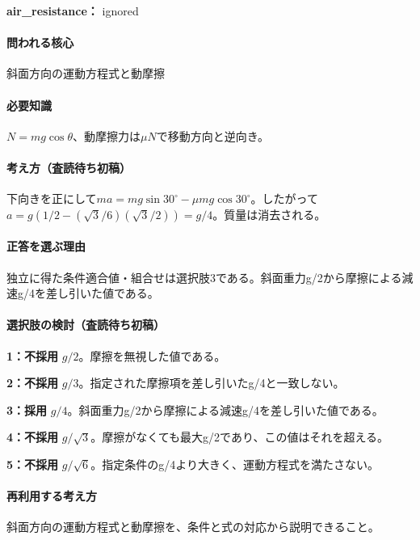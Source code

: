 \noindent\textbf{air\_resistance：} ignored\par

\paragraph{問われる核心} 斜面方向の運動方程式と動摩擦

\paragraph{必要知識} \(N=mg\cos\theta\)、動摩擦力は\(\mu N\)で移動方向と逆向き。

\paragraph{考え方（査読待ち初稿）} 下向きを正にして\(ma=mg\sin30^\circ-\mu mg\cos30^\circ\)。したがって\(a=g(1/2-(\sqrt3/6)(\sqrt3/2))=g/4\)。質量は消去される。

\paragraph{正答を選ぶ理由} 独立に得た条件適合値・組合せは選択肢3である。斜面重力g/2から摩擦による減速g/4を差し引いた値である。

\paragraph{選択肢の検討（査読待ち初稿）}\mbox{}\par

\noindent\textbf{1：不採用} \(g/2\)。摩擦を無視した値である。\par

\noindent\textbf{2：不採用} \(g/3\)。指定された摩擦項を差し引いたg/4と一致しない。\par

\noindent\textbf{3：採用} \(g/4\)。斜面重力g/2から摩擦による減速g/4を差し引いた値である。\par

\noindent\textbf{4：不採用} \(g/\sqrt{3}\)。摩擦がなくても最大g/2であり、この値はそれを超える。\par

\noindent\textbf{5：不採用} \(g/\sqrt{6}\)。指定条件のg/4より大きく、運動方程式を満たさない。\par

\paragraph{再利用する考え方} 斜面方向の運動方程式と動摩擦を、条件と式の対応から説明できること。

